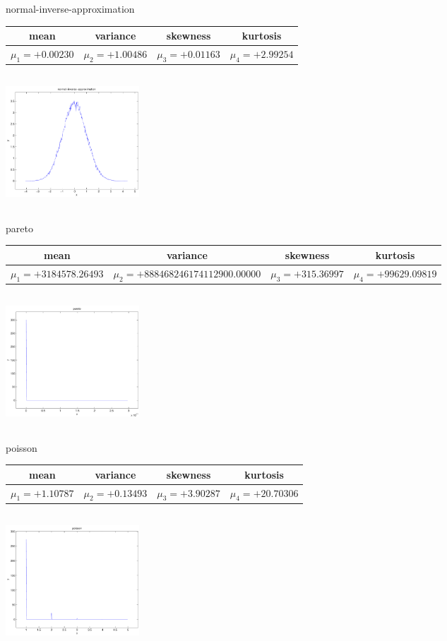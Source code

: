 \documentclass[9pt]{article}
\theoremstyle{plain}
\theoremstyle{definition}
\theoremstyle{remark}
\numberwithin{equation}{section}
\begin{document}
\newpage
normal-inverse-approximation \begin{tabular}{|c|c|c|c|}  mean & variance & skewness & kurtosis \\  \hline
$\mu_1 = +0.00230$ & $\mu_2 = +1.00486$ & $\mu_3 = +0.01163$ & $\mu_4 =+2.99254$ \\
\end{tabular}

\includegraphics[width=5cm,height=5cm]{normal-inverse-approximation.pdf}

pareto \begin{tabular}{|c|c|c|c|}  mean & variance & skewness & kurtosis \\  \hline
$\mu_1 = +3184578.26493$ & $\mu_2 = +888468246174112900.00000$ & $\mu_3 = +315.36997$ & $\mu_4 =+99629.09819$ \\
\end{tabular}

\includegraphics[width=5cm,height=5cm]{pareto.pdf}

poisson \begin{tabular}{|c|c|c|c|}  mean & variance & skewness & kurtosis \\  \hline
$\mu_1 = +1.10787$ & $\mu_2 = +0.13493$ & $\mu_3 = +3.90287$ & $\mu_4 =+20.70306$ \\
\end{tabular}

\includegraphics[width=5cm,height=5cm]{poisson.pdf}
\end{document}
